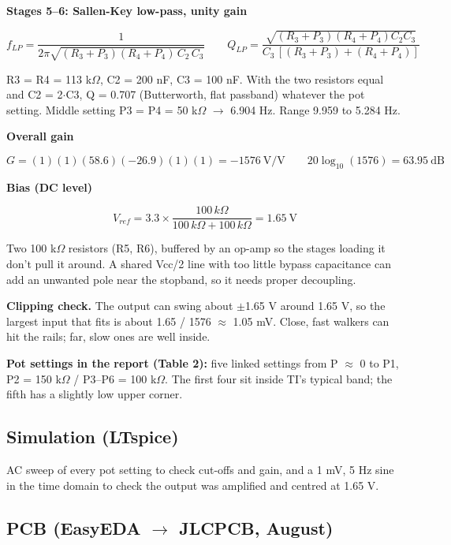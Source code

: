 \documentclass[11pt,a4paper]{article}
\begin{document}
\textbf{Stages 5--6:
Sallen-Key low-pass, unity
gain}

\[
f_{LP} = \frac{1}{2\pi\sqrt{(R_3+P_3)(R_4+P_4)\,C_2\,C_3}} \qquad Q_{LP} = \frac{\sqrt{(R_3+P_3)(R_4+P_4)C_2C_3}}{C_3\,[(R_3+P_3)+(R_4+P_4)]}
\]

R3 = R4 = 113 k$\Omega$, C2 = 200 nF,
C3 = 100 nF. With the two
resistors equal and C2 = 2$\cdot$C3,
Q = 0.707 (Butterworth, flat
passband) whatever the pot
setting. Middle setting P3 =
P4 = 50 k$\Omega$ $\rightarrow$ 6.904 Hz. Range
9.959 to 5.284 Hz.

\textbf{Overall gain}

\[
G = (1)(1)(58.6)(-26.9)(1)(1) = -1576\ \text{V/V} \qquad 20\log_{10}(1576) = 63.95\ \text{dB}
\]

\textbf{Bias (DC level)}

\[
V_{ref} = 3.3 \times \frac{100\,k\Omega}{100\,k\Omega + 100\,k\Omega} = 1.65\ \text{V}
\]

Two 100 k$\Omega$ resistors (R5, R6),
buffered by an op-amp so the
stages loading it don't pull
it around. A shared Vcc/2 line
with too little bypass
capacitance can add an
unwanted pole near the
stopband, so it needs proper
decoupling.

\textbf{Clipping check.} The
output can swing about $\pm$1.65 V
around 1.65 V, so the largest
input that fits is about 1.65
/ 1576 $\approx$ 1.05 mV. Close, fast
walkers can hit the rails;
far, slow ones are well
inside.

\textbf{Pot settings in the
report (Table 2):} five linked
settings from P $\approx$ 0 to P1, P2
= 150 k$\Omega$ / P3--P6 = 100 k$\Omega$.
The first four sit inside TI's
typical band; the fifth has a
slightly low upper corner.

\hypertarget{simulation-ltspice}{%
\subsection{Simulation
(LTspice)}\label{simulation-ltspice}}

AC sweep of every pot setting
to check cut-offs and gain,
and a 1 mV, 5 Hz sine in the
time domain to check the
output was amplified and
centred at 1.65 V.

\hypertarget{pcb-easyeda-jlcpcb-august}{%
\subsection{PCB (EasyEDA $\rightarrow$
JLCPCB,
August)}\label{pcb-easyeda-jlcpcb-august}}
\end{document}
